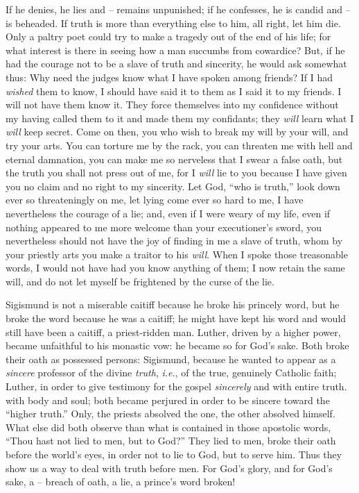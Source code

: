 If he denies, he lies and -- remains unpunished; if he confesses, he is candid 
and -- is beheaded. If truth is more than everything else to him, all right, 
let him die. Only a paltry poet could try to make a tragedy out of the end of 
his life; for what interest is there in seeing how a man succumbs from 
cowardice? But, if he had the courage not to be a slave of truth and 
sincerity, he would ask somewhat thus: Why need the judges know what I have 
spoken among friends? If I had \textit{wished} them to know, I should have 
said it to them as I said it to my friends. I will not have them know it. They 
force themselves into my confidence without my having called them to it and 
made them my confidants; they \textit{will} learn what I \textit{will} keep 
secret. Come on then, you who wish to break my will by your will, and try your 
arts. You can torture me by the rack, you can threaten me with hell and 
eternal damnation, you can make me so nerveless that I swear a false oath, but 
the truth you shall not press out of me, for I \textit{will} lie to you 
because I have given you no claim and no right to my sincerity. Let God, 
``who is truth,'' look down ever so threateningly on me, let lying come ever 
so hard to me, I have nevertheless the courage of a lie; and, even if I were 
weary of my life, even if nothing appeared to me more welcome than your 
executioner's sword, you nevertheless should not have the joy of finding in me 
a slave of truth, whom by your priestly arts you make a traitor to his 
\textit{will}. When I spoke those treasonable words, I would not have had you 
know anything of them; I now retain the same will, and do not let myself be 
frightened by the curse of the lie.

Sigismund is not a miserable caitiff because he broke his princely word, but 
he broke the word because he was a caitiff; he might have kept his word and 
would still have been a caitiff, a priest-ridden man. Luther, driven by a 
higher power, became unfaithful to his monastic vow: he became so for God's 
sake. Both broke their oath as possessed persons: Sigismund, because he wanted 
to appear as a \textit{sincere} professor of the divine \textit{truth}, 
\textit{i.e.}, of the true, genuinely Catholic faith; Luther, in order to 
give testimony for the gospel \textit{sincerely} and with entire truth. with 
body and soul; both became perjured in order to be sincere toward the 
``higher truth.'' Only, the priests absolved the one, the other absolved 
himself. What else did both observe than what is contained in those apostolic 
words, ``Thou hast not lied to men, but to God?'' They lied to men, broke 
their oath before the world's eyes, in order not to lie to God, but to serve 
him. Thus they show us a way to deal with truth before men. For God's glory, 
and for God's sake, a -- breach of oath, a lie, a prince's word broken!

